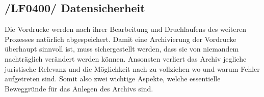 \subsection{/LF0400/ Datensicherheit}
Die Vordrucke werden nach ihrer Bearbeitung und Druchlaufens des weiteren Prozesses natürlich abgespeichert.
Damit eine Archivierung der Vordrucke überhaupt sinnvoll ist, muss sichergestellt werden, dass sie von niemandem  
nachträglich verändert werden können. Ansonsten verliert das Archiv jegliche juristische Relevanz und die Möglichkeit nach zu vollziehen wo und warum Fehler aufgetreten sind. Somit also zwei wichtige Aspekte, welche essentielle Beweggründe für das Anlegen des Archivs sind.   
